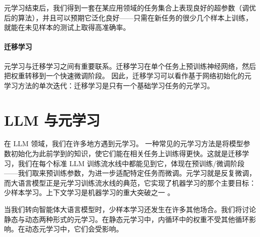 

    
元学习结束后，我们得到一套在某应用领域的任务集合上表现良好的超参数（调优后的算法），并且可以预期它泛化良好——只需在新任务的很少几个样本上训练，就能在未见样本的测试上取得高准确率。

\paragraph{迁移学习}
元学习与迁移学习之间有重要联系。迁移学习在单个任务上预训练神经网络，然后把权重转移到一个快速微调阶段。%
因此，迁移学习可以看作基于网络初始化的元学习方法的单次迭代：迁移学习是只有一个基础学习任务的元学习。


    
\section{LLM 与元学习}
在 LLM 领域，我们在许多地方遇到元学习。
一种常见的元学习方法是将模型参数初始化为此前学到的知识，使它们能在相关任务上训练得更快。这就是迁移学习，我们在每个标准 LLM 训练流水线中都能见到它，体现在预训练/微调阶段——我们取来预训练参数，为进一步适配特定任务而微调。元学习就是反复微调，而大语言模型正是元学习训练流水线的典范，它实现了机器学习的那个主要目标：少样本学习。上下文学习是机器学习的重大突破之一 \citep{brown2020language}。

当我们转向智能体大语言模型时，少样本学习还发生在许多其他场合。我们将讨论静态与动态两种形式的元学习。在静态元学习中，内循环中的权重不受其他循环影响。在动态元学习中，它们会受影响。

